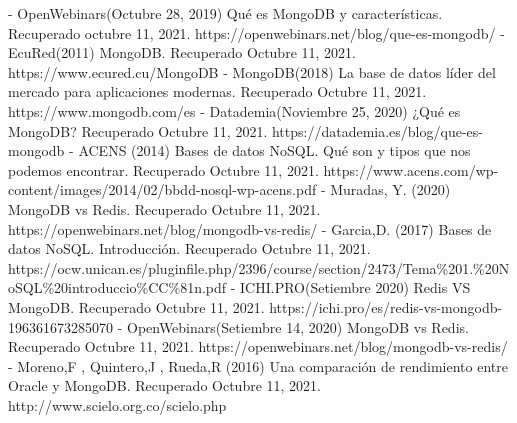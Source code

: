 \documentclass[twoside,twocolumn]{article}
\begin{document}
\begin{thebibliography}{XXX0000}
	\bibitem - OpenWebinars(Octubre 28, 2019) Qué es MongoDB y características. Recuperado octubre 11, 2021. https://openwebinars.net/blog/que-es-mongodb/ 
	\bibitem - EcuRed(2011) MongoDB. Recuperado Octubre 11, 2021. https://www.ecured.cu/MongoDB 
    \bibitem - MongoDB(2018) La base de datos líder del mercado para aplicaciones modernas.  Recuperado Octubre 11, 2021. https://www.mongodb.com/es 
    \bibitem - Datademia(Noviembre 25, 2020) ¿Qué es MongoDB?  Recuperado Octubre 11, 2021. https://datademia.es/blog/que-es-mongodb 
    \bibitem - ACENS (2014) Bases de datos NoSQL. Qué son y tipos que nos podemos encontrar. Recuperado Octubre 11, 2021. https://www.acens.com/wp-content/images/2014/02/bbdd-nosql-wp-acens.pdf 
    \bibitem - Muradas, Y. (2020) MongoDB vs Redis. Recuperado Octubre 11, 2021. https://openwebinars.net/blog/mongodb-vs-redis/ 
    \bibitem - Garcia,D. (2017) Bases de datos NoSQL. Introducción. Recuperado Octubre 11, 2021. https://ocw.unican.es/pluginfile.php/2396/course/section/2473/Tema\%201.\%20NoSQL\%20introduccio\%CC\%81n.pdf 
    \bibitem - ICHI.PRO(Setiembre 2020) Redis VS MongoDB.   Recuperado Octubre 11, 2021. https://ichi.pro/es/redis-vs-mongodb-196361673285070 
    \bibitem - OpenWebinars(Setiembre 14, 2020) MongoDB vs Redis. Recuperado Octubre 11, 2021. https://openwebinars.net/blog/mongodb-vs-redis/ 
    \bibitem - Moreno,F , Quintero,J , Rueda,R (2016) Una comparación de rendimiento entre Oracle y MongoDB. Recuperado Octubre 11, 2021. http://www.scielo.org.co/scielo.php

	\end{thebibliography}

\end{document}
